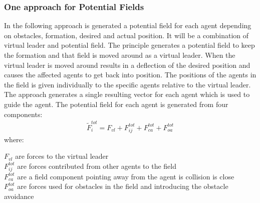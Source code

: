 \subsubsection{One approach for Potential Fields}
In the following approach is generated a potential field for each agent depending on obstacles, formation, desired and actual position. It will be a combination of virtual leader and potential field. The principle generates a potential field to keep the formation and that field is moved around as a virtual leader. When the virtual leader is moved around results in a deflection of the desired position and causes the affected agents to get back into position. The positions of the agents in the field is given individually to the specific agents relative to the virtual leader. The approach generates a single resulting vector for each agent which is used to guide the agent. The potential field for each agent is generated from four components:
\begin{align}
\tilde{F}_i^{tot} = F_{vl}+F_{ij}^{tot}+F_{ca}^{tot}+F_{oa}^{tot}
\end{align}
where:
\begin{ffk}
$F_{vl}$ are forces to the virtual leader\\
$F_{ij}^{tot}$ are forces contributed from other agents to the field\\
$F_{ca}^{tot}$ are a field component pointing away from the agent is collision is close\\
$F_{oa}^{tot}$ are forces used for obstacles in the field and introducing the obstacle avoidance
\end{ffk}
